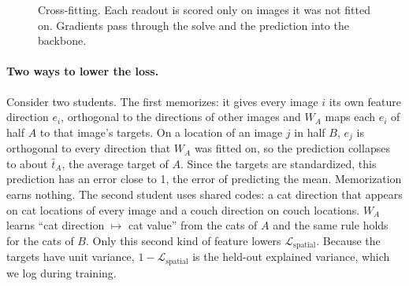 \documentclass{article}
\begin{document}
\begin{figure}[htbp]
\centering
{}
\caption{Cross-fitting. Each readout is scored only on images it was not fitted on. Gradients pass through the solve and the prediction into the backbone.}
\label{fig:crossfit}
\end{figure}

\paragraph{Two ways to lower the loss.}
Consider two students. The first memorizes: it gives every image $i$ its own feature direction $e_i$, orthogonal to the directions of other images and $W_A$ maps each $e_i$ of half $A$ to that image's targets. On a location of an image $j$ in half $B$, $e_j$ is orthogonal to every direction that $W_A$ was fitted on, so the prediction collapses to about $\bar t_A$, the average target of $A$. Since the targets are standardized, this prediction has an error close to 1, the error of predicting the mean. Memorization earns nothing. The second student uses shared codes: a cat direction that appears on cat locations of every image and a couch direction on couch locations. $W_A$ learns ``cat direction $\mapsto$ cat value'' from the cats of $A$ and the same rule holds for the cats of $B$. Only this second kind of feature lowers $\mathcal{L}_{\mathrm{spatial}}$. Because the targets have unit variance, $1-\mathcal{L}_{\mathrm{spatial}}$ is the held-out explained variance, which we log during training.
\end{document}
